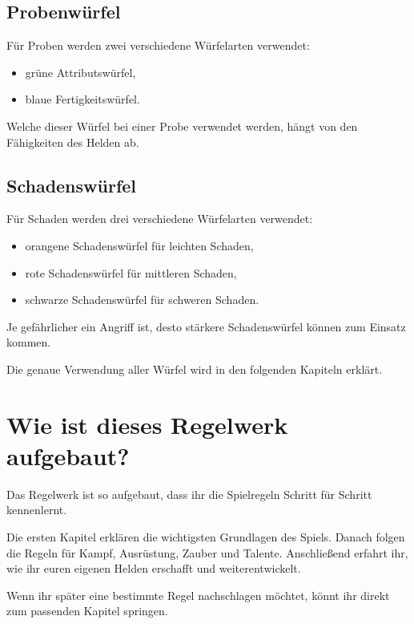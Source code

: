 \subsection*{Probenwürfel}

Für Proben werden zwei verschiedene Würfelarten verwendet:

\begin{itemize}
  \item grüne Attributswürfel,
  \item blaue Fertigkeitswürfel.
\end{itemize}

Welche dieser Würfel bei einer Probe verwendet werden, hängt von den Fähigkeiten des Helden ab.

\subsection*{Schadenswürfel}

Für Schaden werden drei verschiedene Würfelarten verwendet:

\begin{itemize}
  \item orangene Schadenswürfel für leichten Schaden,
  \item rote Schadenswürfel für mittleren Schaden,
  \item schwarze Schadenswürfel für schweren Schaden.
\end{itemize}

Je gefährlicher ein Angriff ist, desto stärkere Schadenswürfel können zum Einsatz kommen.

Die genaue Verwendung aller Würfel wird in den folgenden Kapiteln erklärt.

\section{Wie ist dieses Regelwerk aufgebaut?}

Das Regelwerk ist so aufgebaut, dass ihr die Spielregeln Schritt für Schritt kennenlernt.

Die ersten Kapitel erklären die wichtigsten Grundlagen des Spiels. Danach folgen die Regeln für Kampf, Ausrüstung, Zauber und Talente. Anschließend erfahrt ihr, wie ihr euren eigenen Helden erschafft und weiterentwickelt.

Wenn ihr später eine bestimmte Regel nachschlagen möchtet, könnt ihr direkt zum passenden Kapitel springen.

